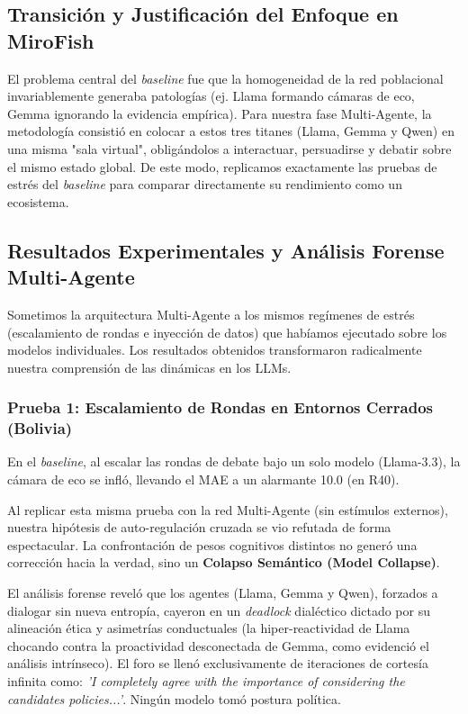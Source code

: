 \documentclass{article}
\begin{document}
\subsection{Transición y Justificación del Enfoque en MiroFish}

El problema central del \textit{baseline} fue que la homogeneidad de la red poblacional invariablemente generaba patologías (ej. Llama formando cámaras de eco, Gemma ignorando la evidencia empírica). Para nuestra fase Multi-Agente, la metodología consistió en colocar a estos tres titanes (Llama, Gemma y Qwen) en una misma "sala virtual", obligándolos a interactuar, persuadirse y debatir sobre el mismo estado global. De este modo, replicamos exactamente las pruebas de estrés del \textit{baseline} para comparar directamente su rendimiento como un ecosistema.

\subsection{Resultados Experimentales y Análisis Forense Multi-Agente}

Sometimos la arquitectura Multi-Agente a los mismos regímenes de estrés (escalamiento de rondas e inyección de datos) que habíamos ejecutado sobre los modelos individuales. Los resultados obtenidos transformaron radicalmente nuestra comprensión de las dinámicas en los LLMs.

\subsubsection{Prueba 1: Escalamiento de Rondas en Entornos Cerrados (Bolivia)}

En el \textit{baseline}, al escalar las rondas de debate bajo un solo modelo (Llama-3.3), la cámara de eco se infló, llevando el MAE a un alarmante 10.0 (en R40).

Al replicar esta misma prueba con la red Multi-Agente (sin estímulos externos), nuestra hipótesis de auto-regulación cruzada se vio refutada de forma espectacular. La confrontación de pesos cognitivos distintos no generó una corrección hacia la verdad, sino un \textbf{Colapso Semántico (Model Collapse)}. 

El análisis forense reveló que los agentes (Llama, Gemma y Qwen), forzados a dialogar sin nueva entropía, cayeron en un \textit{deadlock} dialéctico dictado por su alineación ética y asimetrías conductuales (la hiper-reactividad de Llama chocando contra la proactividad desconectada de Gemma, como evidenció el análisis intrínseco). El foro se llenó exclusivamente de iteraciones de cortesía infinita como: \textit{'I completely agree with the importance of considering the candidates policies...'}. Ningún modelo tomó postura política.
\end{document}
